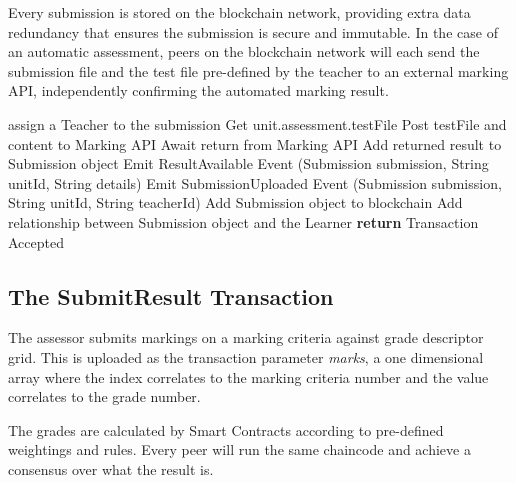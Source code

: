 Every submission is stored on the blockchain network, providing extra data redundancy that ensures 
the submission is secure and immutable. In the case of an automatic assessment, peers on the 
blockchain network will each send the submission file and the test file pre-defined by the teacher 
to an external marking API, independently confirming the automated marking result.
\clearpage
\begin{algorithm}
	\begin{algorithmic}[0]
		\State assign a Teacher to the submission
		\State Get unit.assessment.testFile
		\State Post testFile and content to Marking API 
		\State Await return from Marking API
		\State Add returned result to Submission object
		\State Emit ResultAvailable Event (Submission submission, String unitId, String details)
		\State Emit SubmissionUploaded Event (Submission submission, String unitId, String teacherId)
		\EndIf
		\State Add Submission object to blockchain
		\State Add relationship between Submission object and the Learner
		\State \textbf{return} Transaction Accepted
		\EndFunction
	\end{algorithmic}
\end{algorithm}

\subsection{The SubmitResult Transaction}

The assessor submits markings on a marking criteria against grade descriptor grid. This is uploaded as the transaction
parameter \textit{marks}, a one dimensional array where the index correlates to the marking criteria number and
the value correlates to the grade number.

The grades are calculated by Smart Contracts according to pre-defined weightings and rules. 
Every peer will run the same chaincode and achieve a consensus over what the result is.

